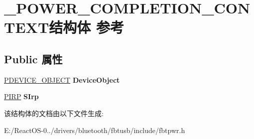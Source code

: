 \hypertarget{struct___p_o_w_e_r___c_o_m_p_l_e_t_i_o_n___c_o_n_t_e_x_t}{}\section{\+\_\+\+P\+O\+W\+E\+R\+\_\+\+C\+O\+M\+P\+L\+E\+T\+I\+O\+N\+\_\+\+C\+O\+N\+T\+E\+X\+T结构体 参考}
\label{struct___p_o_w_e_r___c_o_m_p_l_e_t_i_o_n___c_o_n_t_e_x_t}
\subsection*{Public 属性}
\begin{DoxyCompactItemize}
\item 
\mbox{\label{struct___p_o_w_e_r___c_o_m_p_l_e_t_i_o_n___c_o_n_t_e_x_t_a4dd0771abc27d736e936185942884c62}} 
\hyperlink{struct___d_e_v_i_c_e___o_b_j_e_c_t}{P\+D\+E\+V\+I\+C\+E\+\_\+\+O\+B\+J\+E\+CT} {\bfseries Device\+Object}
\item 
\mbox{\label{struct___p_o_w_e_r___c_o_m_p_l_e_t_i_o_n___c_o_n_t_e_x_t_afed67bf4aefeffeecf082eade53de9e3}} 
\hyperlink{interfacevoid}{P\+I\+RP} {\bfseries S\+Irp}
\end{DoxyCompactItemize}


该结构体的文档由以下文件生成\+:\begin{DoxyCompactItemize}
\item 
E\+:/\+React\+O\+S-\/0../drivers/bluetooth/fbtusb/include/fbtpwr.\+h\end{DoxyCompactItemize}

